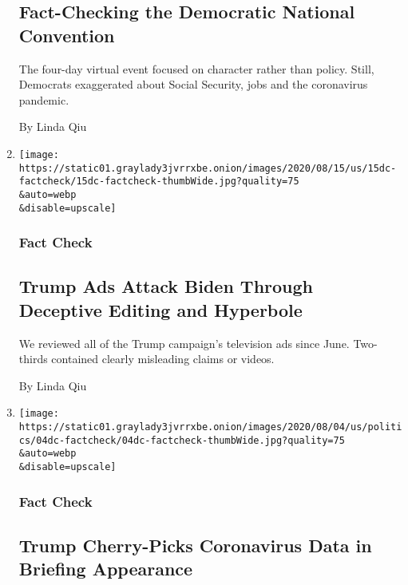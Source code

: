 \begin{enumerate}
{  \subsection{Fact-Checking the Democratic National
  Convention}\label{fact-checking-the-democratic-national-convention}}

  The four-day virtual event focused on character rather than policy.
  Still, Democrats exaggerated about Social Security, jobs and the
  coronavirus pandemic.

  By Linda Qiu
\item
  \href{/2020/08/15/us/politics/trump-campaign-ads-biden.html}{}

  \texttt{[image: https://static01.graylady3jvrrxbe.onion/images/2020/08/15/us/15dc-factcheck/15dc-factcheck-thumbWide.jpg?quality=75\\\&auto=webp\\\&disable=upscale]}

  \hypertarget{fact-check-2}{%
  \subsubsection{Fact Check}\label{fact-check-2}}

  \hypertarget{trump-ads-attack-biden-through-deceptive-editing-and-hyperbole}{%
  \subsection{Trump Ads Attack Biden Through Deceptive Editing and
  Hyperbole}\label{trump-ads-attack-biden-through-deceptive-editing-and-hyperbole}}

  We reviewed all of the Trump campaign's television ads since June.
  Two-thirds contained clearly misleading claims or videos.

  By Linda Qiu
\item
  \href{/2020/08/04/us/politics/coronavirus-trump-data-briefing.html}{}

  \texttt{[image: https://static01.graylady3jvrrxbe.onion/images/2020/08/04/us/politics/04dc-factcheck/04dc-factcheck-thumbWide.jpg?quality=75\\\&auto=webp\\\&disable=upscale]}

  \hypertarget{fact-check-3}{%
  \subsubsection{Fact Check}\label{fact-check-3}}

  \hypertarget{trump-cherry-picks-coronavirus-data-in-briefing-appearance}{%
  \subsection{Trump Cherry-Picks Coronavirus Data in Briefing
  Appearance}\label{trump-cherry-picks-coronavirus-data-in-briefing-appearance}}


\end{enumerate}
